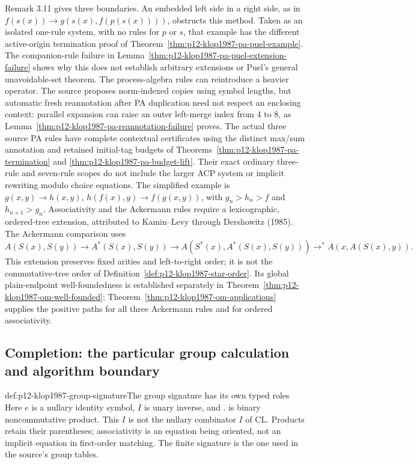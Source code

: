 Remark 3.11 gives three boundaries. An embedded left side in a right side,
as in \(f(s(x))\to g(s(x),f(p(s(x))))\), obstructs this method.
Taken as an isolated one-rule system, with no rules for \(p\) or \(s\),
that example has the different active-origin termination proof of
Theorem~\ref{thm:p12-klop1987-pa-puel-example}. The companion-rule
failure in Lemma~\ref{thm:p12-klop1987-pa-puel-extension-failure}
shows why this does not establish arbitrary extensions or Puel's
general unavoidable-set theorem.
The process-algebra rules can reintroduce a heavier operator. The source
proposes norm-indexed copies using symbol lengths, but automatic fresh
reannotation after PA duplication need not respect an enclosing context:
parallel expansion can raise an outer left-merge index from 4 to 8, as
Lemma~\ref{thm:p12-klop1987-pa-reannotation-failure} proves.
The actual three source PA rules have complete contextual certificates
using the distinct max/sum annotation and retained initial-tag budgets
of Theorems~\ref{thm:p12-klop1987-pa-termination} and
\ref{thm:p12-klop1987-pa-budget-lift}. Their exact ordinary
three-rule and seven-rule scopes do not include the larger ACP system
or implicit rewriting modulo choice equations.
The simplified example is \(g(x,y)\to h(x,y)\),
\(h(f(x),y)\to f(g(x,y))\), with
\(g_n>h_n>f\) and \(h_{n+1}>g_n\).
Associativity and the Ackermann rules require a lexicographic, ordered-tree
extension, attributed to Kamin--Levy through Dershowitz (1985).
The Ackermann comparison uses
\[
 A(S(x),S(y))\to A^*(S(x),S(y))
 \to A(S^*(x),A^*(S(x),S(y)))
 \to^* A(x,A(S(x),y)).
\]
This extension preserves fixed arities and left-to-right order; it is not
the commutative-tree order of Definition~\ref{def:p12-klop1987-star-order}.
Its global plain-endpoint well-foundedness is established separately in
Theorem~\ref{thm:p12-klop1987-om-well-founded};
Theorem~\ref{thm:p12-klop1987-om-applications} supplies the positive
paths for all three Ackermann rules and for ordered associativity.





\subsection{Completion: the particular group calculation and algorithm boundary}

\begin{hbconvention}{def:p12-klop1987-group-signature}{The group signature has its own typed roles}
Here \(e\) is a nullary identity symbol, \(I\) is unary inverse,
and \(.\) is binary noncommutative product. This \(I\) is not the
nullary combinator \(I\) of CL. Products retain their parentheses;
associativity is an equation being oriented, not an implicit equation
in first-order matching. The finite signature is the one used in the
source's group tables.
\end{hbconvention}

